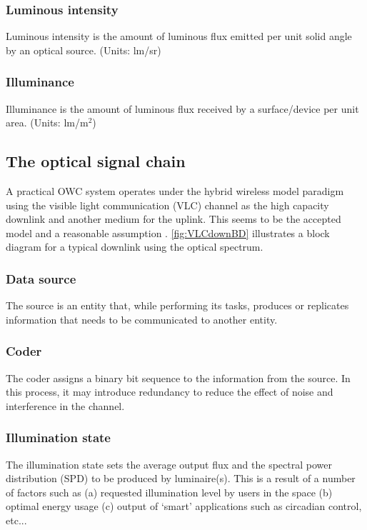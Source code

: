\subsubsection{Luminous intensity}
\label{subsubsec:luminousIntensity}
Luminous intensity is the amount of luminous flux emitted per unit solid angle by an optical source. (Units: lm/sr)

\subsubsection{Illuminance}
\label{subsubsec:illuminance}
Illuminance is the amount of luminous flux received by a surface/device per unit area. (Units: lm/m$^{2}$)

\subsection{The optical signal chain}
\label{subsec:outlineDownlink}

A practical OWC system operates under the hybrid wireless model paradigm using the visible light communication (VLC) channel as the high capacity downlink and another medium for the uplink. This seems to be the accepted model and a reasonable assumption \cite{rah15a}. \figurename{ \ref{fig:VLCdownBD}} illustrates a block diagram for a typical downlink using the optical spectrum.

\subsubsection{Data source}
\label{subsubsec:outlineSource}
The source is an entity that, while performing its tasks, produces or replicates information that needs to be communicated to another entity. 

\subsubsection{Coder}
\label{subsubsec:outlineCoder}
The coder assigns a binary bit sequence to the information from the source. In this process, it may introduce redundancy to reduce the effect of noise and interference in the channel. 

\subsubsection{Illumination state}
\label{subsubsec:outlineIllumination}
The illumination state sets the average output flux and the spectral power distribution (SPD) to be produced by luminaire(s). This is a result of a number of factors such as (a) requested illumination level by users in the space (b) optimal energy usage (c) output of `smart' applications such as circadian control, etc...


